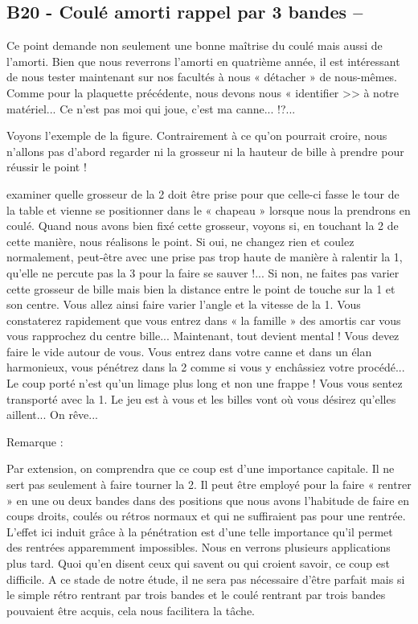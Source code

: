 \subsection{B20 - Coulé amorti rappel par 3 bandes --
}\label{b20---couluxe9-amorti-rappel-par-3-bandes}

Ce point demande non seulement une bonne maîtrise du coulé mais aussi de
l'amorti. Bien que nous reverrons l'amorti en quatrième année, il est
intéressant de nous tester maintenant sur nos facultés à nous « détacher
» de nous-mêmes. Comme pour la plaquette précédente, nous devons nous «
identifier \textgreater{}\textgreater{} à notre matériel... Ce n'est pas
moi qui joue, c'est ma canne... !?...

Voyons l'exemple de la figure. Contrairement à ce qu'on pourrait croire,
nous n'allons pas d'abord regarder ni la grosseur ni la hauteur de bille
à prendre pour réussir le point !

examiner quelle grosseur de la 2 doit être prise pour que celle-ci fasse
le tour de la table et vienne se positionner dans le « chapeau » lorsque
nous la prendrons en coulé. Quand nous avons bien fixé cette grosseur,
voyons si, en touchant la 2 de cette manière, nous réalisons le point.
Si oui, ne changez rien et coulez normalement, peut-être avec une prise
pas trop haute de manière à ralentir la 1, qu'elle ne percute pas la 3
pour la faire se sauver !... Si non, ne faites pas varier cette grosseur
de bille mais bien la distance entre le point de touche sur la 1 et son
centre. Vous allez ainsi faire varier l'angle et la vitesse de la 1.
Vous constaterez rapidement que vous entrez dans « la famille » des
amortis car vous vous rapprochez du centre bille... Maintenant, tout
devient mental ! Vous devez faire le vide autour de vous. Vous entrez
dans votre canne et dans un élan harmonieux, vous pénétrez dans la 2
comme si vous y enchâssiez votre procédé... Le coup porté n'est qu'un
limage plus long et non une frappe ! Vous vous sentez transporté avec la
1. Le jeu est à vous et les billes vont où vous désirez qu'elles
aillent... On rêve...

Remarque :

Par extension, on comprendra que ce coup est d'une importance capitale.
Il ne sert pas seulement à faire tourner la 2. Il peut être employé pour
la faire « rentrer » en une ou deux bandes dans des positions que nous
avons l'habitude de faire en coups droits, coulés ou rétros normaux et
qui ne suffiraient pas pour une rentrée. L'effet ici induit grâce à la
pénétration est d'une telle importance qu'il permet des rentrées
apparemment impossibles. Nous en verrons plusieurs applications plus
tard. Quoi qu'en disent ceux qui savent ou qui croient savoir, ce coup
est difficile. A ce stade de notre étude, il ne sera pas nécessaire
d'être parfait mais si le simple rétro rentrant par trois bandes et le
coulé rentrant par trois bandes pouvaient être acquis, cela nous
facilitera la tâche.

